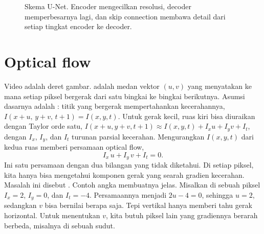 \begin{figure}[ht]
\centering
{}
\caption{Skema U-Net. Encoder mengecilkan resolusi, decoder memperbesarnya lagi, dan skip
connection membawa detail dari setiap tingkat encoder ke decoder.}
\label{fig:unet}
\end{figure}

\section{Optical flow}

Video adalah deret gambar.  adalah medan vektor $(u,v)$ yang menyatakan ke mana
setiap piksel bergerak dari satu bingkai ke bingkai berikutnya. Asumsi dasarnya adalah
: titik yang bergerak mempertahankan kecerahannya,
$I(x+u,\,y+v,\,t+1)=I(x,y,t)$. Untuk gerak kecil, ruas kiri bisa diuraikan dengan Taylor orde satu,
$I(x+u,y+v,t+1)\approx I(x,y,t)+I_xu+I_yv+I_t$, dengan $I_x$, $I_y$, dan $I_t$ turunan parsial kecerahan.
Mengurangkan $I(x,y,t)$ dari kedua ruas memberi persamaan optical flow,
\begin{equation}
I_x\,u+I_y\,v+I_t=0.
\label{eq:opticalflow}
\end{equation}
Ini satu persamaan dengan dua bilangan yang tidak diketahui. Di setiap piksel, kita hanya bisa
mengetahui komponen gerak yang searah gradien kecerahan. Masalah ini disebut . Contoh angka membuatnya jelas. Misalkan di sebuah piksel $I_x=2$, $I_y=0$, dan $I_t=-4$.
Persamaannya menjadi $2u-4=0$, sehingga $u=2$, sedangkan $v$ bisa bernilai berapa saja. Tepi
vertikal hanya memberi tahu gerak horizontal. Untuk menentukan $v$, kita butuh piksel lain yang
gradiennya berarah berbeda, misalnya di sebuah sudut.

